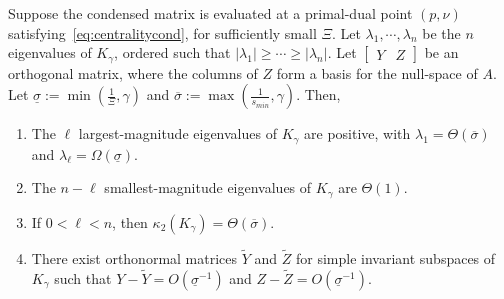 \documentclass[smallextended]{svjour3}
\newcommand{\cond}{\kappa_2}
\begin{document}
\begin{theorem}
  \label{thm:cond}
  Suppose the condensed matrix is evaluated at a primal-dual
  point $(p, \nu)$ satisfying~\eqref{eq:centralitycond},
  for sufficiently small $\Xi$.
  Let $\lambda_1, \cdots, \lambda_n$ be the $n$ eigenvalues of
  $K_\gamma$, ordered such that $|\lambda_1| \geq  \cdots \geq |\lambda_n|$.
  Let $\begin{bmatrix} Y & Z \end{bmatrix}$ be an orthogonal
  matrix, where the columns of $Z$ form a basis for the null-space of
  $A$. Let $\underline{\sigma} :=\min\left(\frac{1}{\Xi}, \gamma\right)$
  and $\overline{\sigma} := \max\left(\frac{1}{s_{min}}, \gamma\right)$.
  Then,
  \begin{enumerate}
    \item[(i)] The $\ell$ largest-magnitude eigenvalues of $K_\gamma$ are positive,
      with $\lambda_1 = \Theta(\overline{\sigma})$ and $\lambda_{\ell} = \Omega(\underline{\sigma})$.
    \item[(ii)] The $n-\ell$ smallest-magnitude eigenvalues of $K_\gamma$
      are $\Theta(1)$.
    \item[(iii)] If $0 < \ell < n$, then $\cond(K_\gamma) = \Theta(\overline{\sigma})$.
    \item[(iv)] There exist orthonormal matrices $\widetilde{Y}$ and $\widetilde{Z}$ for
      simple invariant subspaces of $K_\gamma$ such that $Y - \widetilde{Y} = O(\underline{\sigma}^{-1})$
      and $Z - \widetilde{Z} = O(\underline{\sigma}^{-1})$.
  \end{enumerate}
\end{theorem}
\end{document}
